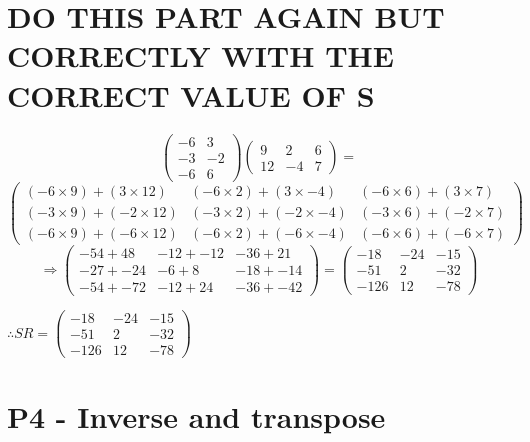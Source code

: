 \documentclass{article}
\begin{document}
\section{DO THIS PART AGAIN BUT CORRECTLY WITH THE CORRECT VALUE OF S}
\[
	\begin{pmatrix}
		-6 & 3\\
		-3 & -2\\
		-6 & 6
	\end{pmatrix}
	\begin{pmatrix}
		9 & 2 & 6\\
		12 & -4 & 7
	\end{pmatrix}
	=
\]
\[
	\begin{pmatrix}
		(-6\times9)+(3\times12) & (-6\times2)+(3\times-4) & (-6\times6)+(3\times7)\\
		(-3\times9)+(-2\times12) & (-3\times2)+(-2\times-4) & (-3\times6)+(-2\times7)\\
		(-6\times9)+(-6\times12) & (-6\times2)+(-6\times-4) & (-6\times6)+(-6\times7)
	\end{pmatrix}

\]
\[
	\Rightarrow
	\begin{pmatrix}
		-54+48 & -12+-12 & -36+21\\
		-27+-24 & -6+8 & -18+-14\\
		-54+-72 & -12+24 & -36+-42
	\end{pmatrix}
	=
	\begin{pmatrix}
		-18 & -24 & -15\\
		-51 & 2 & -32\\
		-126 & 12 & -78
	\end{pmatrix}
\]
\begin{center}\vspace{0.5cm}$\therefore
	SR=
	\begin{pmatrix}
		-18 & -24 & -15\\
		-51 & 2 & -32\\
		-126 & 12 & -78
	\end{pmatrix}
$\end{center}

\section{P4 - Inverse and transpose}
\end{document}
